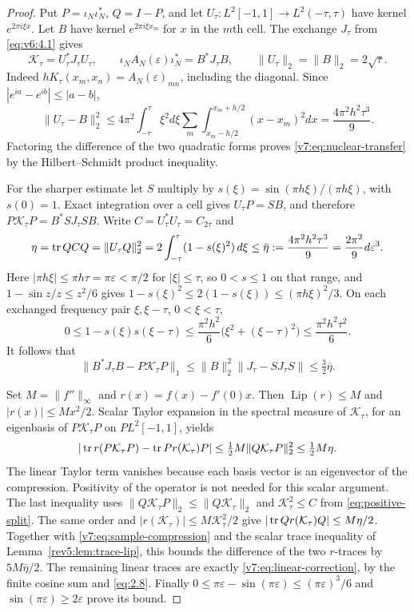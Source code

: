 \begin{proof}
Put $P=\iota_N\iota_N^*$, $Q=I-P$, and let
$U_\tau:L^2[-1,1]\to L^2(-\tau,\tau)$ have kernel $e^{2\pi i\xi x}$.
Let $B$ have kernel $e^{2\pi i\xi x_m}$ for $x$ in the $m$th cell.
The exchange $J_\tau$ from \eqref{eq:v6:4.1} gives
\[
 \mathcal K_\tau=U_\tau^*J_\tau U_\tau,\qquad
 \iota_NA_N(\varepsilon)\iota_N^*=B^*J_\tau B,
 \qquad \|U_\tau\|_2=\|B\|_2=2\sqrt\tau.
\]
Indeed $hK_\tau(x_m,x_n)=A_N(\varepsilon)_{mn}$, including the diagonal.
Since $|e^{ia}-e^{ib}|\le|a-b|$,
\[
 \|U_\tau-B\|_2^2\le
 4\pi^2\int_{-\tau}^\tau\xi^2d\xi
       \sum_m\int_{x_m-h/2}^{x_m+h/2}(x-x_m)^2dx
 =\frac{4\pi^2h^2\tau^3}{9}.
\]
Factoring the difference of the two quadratic forms proves
\eqref{v7:eq:nuclear-transfer} by the Hilbert--Schmidt product inequality.

For the sharper estimate let $S$ multiply by
$s(\xi)=\sin(\pi h\xi)/(\pi h\xi)$, with $s(0)=1$.
Exact integration over a cell gives $U_\tau P=SB$, and therefore
$P\mathcal K_\tau P=B^*SJ_\tau SB$.  Write $C=U_\tau^*U_\tau=C_{2\tau}$ and
\[
 \eta=\operatorname{tr} QCQ=\|U_\tau Q\|_2^2
 =2\int_{-\tau}^\tau(1-s(\xi)^2)\,d\xi
 \le\bar\eta:=\frac{4\pi^2h^2\tau^3}{9}
 =\frac{2\pi^2}{9}d\varepsilon^3.
\]
Here $|\pi h\xi|\le\pi h\tau=\pi\varepsilon<\pi/2$ for $|\xi|\le\tau$, so
$0<s\le1$ on that range, and $1-\sin z/z\le z^2/6$ gives
$1-s(\xi)^2\le2(1-s(\xi))\le(\pi h\xi)^2/3$.
On each exchanged frequency pair $\xi,\xi-\tau$, $0<\xi<\tau$,
\[
 0\le1-s(\xi)s(\xi-\tau)
 \le\frac{\pi^2h^2}{6}\bigl(\xi^2+(\xi-\tau)^2\bigr)
 \le\frac{\pi^2h^2\tau^2}{6}.
\]
It follows that
\begin{equation}\label{v7:eq:sample-compression}
 \|B^*J_\tau B-P\mathcal K_\tau P\|_1
 \le\|B\|_2^2\|J_\tau-SJ_\tau S\|
 \le\tfrac32\bar\eta.
\end{equation}

Set $M=\|f''\|_\infty$ and $r(x)=f(x)-f'(0)x$.
Then $\operatorname{Lip}(r)\le M$ and $|r(x)|\le Mx^2/2$.
Scalar Taylor expansion in the spectral measure of $\mathcal K_\tau$,
for an eigenbasis of $P\mathcal K_\tau P$ on $P L^2[-1,1]$, yields
\[
 |\operatorname{tr} r(P\mathcal K_\tau P)-\operatorname{tr} P r(\mathcal K_\tau)P|
 \le\tfrac12M\|Q\mathcal K_\tau P\|_2^2\le\tfrac12M\eta.
\]
The linear Taylor term vanishes because each basis vector is an
eigenvector of the compression.  Positivity of the operator is not
needed for this scalar argument.  The last inequality uses $\|Q\mathcal K_\tau P\|_2\le\|Q\mathcal K_\tau\|_2$ and
$\mathcal K_\tau^2\le C$ from \eqref{eq:positive-split}.
The same order and $|r(\mathcal K_\tau)|\le M\mathcal K_\tau^2/2$ give
$|\operatorname{tr} Qr(\mathcal K_\tau)Q|\le M\eta/2$.
Together with \eqref{v7:eq:sample-compression} and the scalar trace
inequality of Lemma~\ref{rev5:lem:trace-lip}, this bounds the difference
of the two $r$-traces by $5M\bar\eta/2$.
The remaining linear traces are exactly \eqref{v7:eq:linear-correction},
by the finite cosine sum and \eqref{eq:2.8}.
Finally $0\le\pi\varepsilon-\sin(\pi\varepsilon)
\le(\pi\varepsilon)^3/6$ and
$\sin(\pi\varepsilon)\ge2\varepsilon$ prove its bound.
\end{proof}

